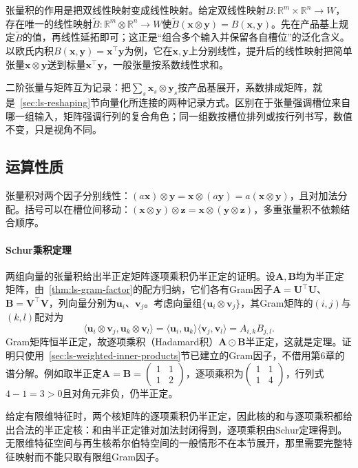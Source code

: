 张量积的作用是把双线性映射变成线性映射。给定双线性映射$B:\mathbb R^m\times\mathbb R^n\to W$，存在唯一的线性映射$\widetilde B:\mathbb R^m\otimes\mathbb R^n\to W$使$\widetilde B(\bm x\otimes\bm y)=B(\bm x,\bm y)$。先在产品基上规定$\widetilde B$的值，再线性延拓即可；这正是“组合多个输入并保留各自槽位”的泛化含义。以欧氏内积$B(\bm x,\bm y)=\bm x^\top\bm y$为例，它在$\bm x,\bm y$上分别线性，提升后的线性映射把简单张量$\bm x\otimes\bm y$送到标量$\bm x^\top\bm y$，一般张量按系数线性求和。

二阶张量与矩阵互为记录：把$\sum_s\bm x_s\otimes\bm y_s$按产品基展开，系数排成矩阵，就是~\ref{sec:ls-reshaping}节向量化所连接的两种记录方式。区别在于张量强调槽位来自哪一组输入，矩阵强调行列的复合角色；同一组数按槽位排列或按行列书写，数值不变，只是视角不同。

\subsection{运算性质}

张量积对两个因子分别线性：$(a\bm x)\otimes\bm y=\bm x\otimes(a\bm y)=a(\bm x\otimes\bm y)$，且对加法分配。括号可以在槽位间移动：$(\bm x\otimes\bm y)\otimes\bm z=\bm x\otimes(\bm y\otimes\bm z)$，多重张量积不依赖结合顺序。

\paragraph{Schur乘积定理}

两组向量的张量积给出半正定矩阵逐项乘积仍半正定的证明。设$\bm A,\bm B$均为半正定矩阵，由~\ref{thm:ls-gram-factor}的配方归纳，它们各有Gram因子$\bm A=\bm U^\top\bm U$、$\bm B=\bm V^\top\bm V$，列向量分别为$\bm u_i$、$\bm v_j$。考虑向量组$\{\bm u_i\otimes\bm v_j\}$，其Gram矩阵的$(i,j)$与$(k,l)$配对为
\[
 \langle\bm u_i\otimes\bm v_j,\bm u_k\otimes\bm v_l\rangle
 =\langle\bm u_i,\bm u_k\rangle\langle\bm v_j,\bm v_l\rangle
 =A_{i,k}B_{j,l}.
\]
Gram矩阵恒半正定，故逐项乘积（Hadamard积）$\bm A\odot\bm B$半正定，这就是定理。证明只使用~\ref{sec:ls-weighted-inner-products}节已建立的Gram因子，不借用第6章的谱分解。例如取半正定$\bm A=\bm B=\begin{pmatrix}1&1\\1&2\end{pmatrix}$，逐项乘积为$\begin{pmatrix}1&1\\1&4\end{pmatrix}$，行列式$4-1=3>0$且对角元非负，仍半正定。

给定有限维特征时，两个核矩阵的逐项乘积仍半正定，因此核的和与逐项乘积都给出合法的半正定核：和由半正定锥对加法封闭得到，逐项乘积由Schur定理得到。无限维特征空间与再生核希尔伯特空间的一般情形不在本节展开，那里需要完整特征映射而不能只取有限组Gram因子。

